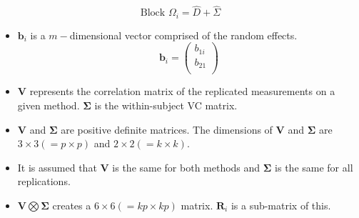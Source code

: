 \documentclass[12pt, a4paper]{report}
\theoremstyle{plain}
\theoremstyle{definition}
\theoremstyle{remark}
\begin{document}
\begin{equation}
\mbox{Block  }\Omega_{i} = \hat{D} + \hat{\Sigma}
\end{equation}
\begin{itemize}
	
	
	\item $\boldsymbol{b}_{i}$ is a $m-$dimensional vector comprised of
	the random effects.
	\begin{equation}
	\boldsymbol{b}_{i} = \left( \begin{array}{c}
	b_{1i} \\
	b_{21}  \\
	\end{array}\right)
	\end{equation}
	
	\item $\boldsymbol{V}$ represents the correlation matrix of the replicated measurements on a given method.
	$\boldsymbol{\Sigma}$ is the within-subject VC matrix.
	
	\item $\boldsymbol{V}$ and $\boldsymbol{\Sigma}$ are positive
	definite matrices. The dimensions of $\boldsymbol{V}$ and
	$\boldsymbol{\Sigma}$ are $3 \times 3 ( = p \times p )$ and $ 2 \times
	2 (= k \times k)$.
	
	\item It is assumed that $\boldsymbol{V}$ is the same for both methods and $\boldsymbol{\Sigma}$ is
	the same for all replications.
	
	\item $\boldsymbol{V} \bigotimes \boldsymbol{\Sigma}$ creates a $ 6 \times 6 ( = kp \times
	kp)$ matrix.
	$\boldsymbol{R}_{i}$ is a sub-matrix of this.
\end{itemize}
\end{document}
